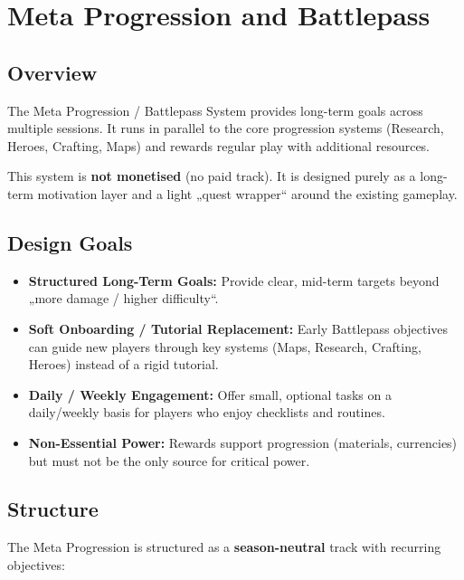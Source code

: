 \section{Meta Progression and Battlepass }
\label{sec:meta-progression}

\subsection{Overview}

The Meta Progression / Battlepass System provides long-term goals across multiple sessions.
It runs in parallel to the core progression systems (Research, Heroes, Crafting, Maps) and rewards
regular play with additional resources.

This system is \textbf{not monetised} (no paid track). It is designed purely as
a long-term motivation layer and a light „quest wrapper“ around the existing gameplay.

\subsection{Design Goals}

\begin{itemize}
	\item \textbf{Structured Long-Term Goals:}
	Provide clear, mid-term targets beyond „more damage / higher difficulty“.
	\item \textbf{Soft Onboarding / Tutorial Replacement:}
	Early Battlepass objectives can guide new players through key systems
	(Maps, Research, Crafting, Heroes) instead of a rigid tutorial.
	\item \textbf{Daily / Weekly Engagement:}
	Offer small, optional tasks on a daily/weekly basis for players who enjoy checklists and routines.
	\item \textbf{Non-Essential Power:}
	Rewards support progression (materials, currencies) but must not be the only source for critical power.
\end{itemize}

\subsection{Structure}

The Meta Progression is structured as a \textbf{season-neutral} track with recurring objectives:

